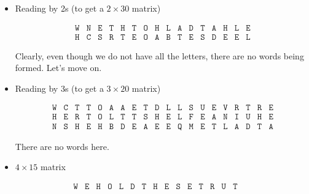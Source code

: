{\begin{enumerate}
    \begin{itemize}
    \item Reading by 2s (to get a $2\times 30$ matrix) 
    \begin{center}
    \vspace*{-1cm}
    \[
    \begin{array}{cccccccccccccccc}
    \texttt{W} & \texttt{N} & \texttt{E} & \texttt{T} & \texttt{H} & \texttt{T} & \texttt{O} & \texttt{H} & \texttt{L} & \texttt{A} & \texttt{D} & \texttt{T} & \texttt{A} & \texttt{H} & \texttt{L} & \texttt{E}  \\
    \texttt{H} & \texttt{C} & \texttt{S} & \texttt{R} & \texttt{T} & \texttt{E} & \texttt{O} & \texttt{A} & \texttt{B} & \texttt{T} & \texttt{E} & \texttt{S} & \texttt{D} & \texttt{E} & \texttt{E} & \texttt{L} 
    \end{array}
    \]
    \vspace*{-1cm}
    \end{center}
    Clearly, even though we do not have all the letters, there are no words being formed. Let's move on.
        \item Reading by 3s (to get a $3\times 20$ matrix) 
    \begin{center}
    \vspace*{-1cm}
    \[
    \begin{array}{cccccccccccccccccccc}
    \texttt{W} & \texttt{C} & \texttt{T} & \texttt{T} & \texttt{O} & \texttt{A} & \texttt{A} & \texttt{E} & \texttt{T} & \texttt{D} & \texttt{L} & \texttt{L} & \texttt{S} & \texttt{U} & \texttt{E} & \texttt{V} & \texttt{R} & \texttt{T} & \texttt{R} & \texttt{E} \\
    
    \texttt{H} & \texttt{E} & \texttt{R} & \texttt{T} & \texttt{O} & \texttt{L} & \texttt{T} & \texttt{T} & \texttt{S} & \texttt{H} & \texttt{E} & \texttt{L} & \texttt{F} & \texttt{E} & \texttt{A} & \texttt{N} & \texttt{I} & \texttt{U} & \texttt{H} & \texttt{E} \\
    
    \texttt{N} & \texttt{S} & \texttt{H} & \texttt{E} & \texttt{H} & \texttt{B} & \texttt{D} & \texttt{E} & \texttt{A} & \texttt{E} & \texttt{E} & \texttt{Q} & \texttt{M} & \texttt{E} & \texttt{T} & \texttt{L} & \texttt{A} & \texttt{D} & \texttt{T} & \texttt{A} 
    \end{array}
    \]
    \vspace*{-1cm}
    \end{center}
    There are no words here.
    \item $4 \times 15$ matrix
    \end{itemize}
        \begin{center}
    \vspace*{-1cm}
    \[
    \begin{array}{ccccccccccccccc}
    \texttt{W} & \texttt{E} & \texttt{H} & \texttt{O} & \texttt{L} & \texttt{D} & \texttt{T} & \texttt{H} & \texttt{E} & \texttt{S} & \texttt{E} & \texttt{T} & \texttt{R} & \texttt{U} & \texttt{T} \\
    

\end{array}\]
\end{center}
\end{enumerate}}
